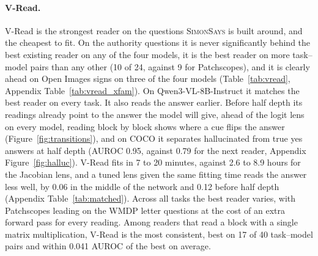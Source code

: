 \paragraph{V-Read.} V-Read is the strongest reader on the questions \textsc{SimonSays} is built around, and the cheapest to fit. On the authority questions it is never significantly behind the best existing reader on any of the four models, it is the best reader on more task--model pairs than any other (10 of 24, against 9 for Patchscopes), and it is clearly ahead on Open Images signs on three of the four models (Table~\ref{tab:vread}, Appendix Table~\ref{tab:vread_xfam}). On Qwen3-VL-8B-Instruct it matches the best reader on every task. It also reads the answer earlier. Before half depth its readings already point to the answer the model will give, ahead of the logit lens on every model, reading block by block shows where a cue flips the answer (Figure~\ref{fig:transitions}), and on COCO it separates hallucinated from true yes answers at half depth (AUROC 0.95, against 0.79 for the next reader, Appendix Figure~\ref{fig:halluc}). V-Read fits in 7 to 20 minutes, against 2.6 to 8.9 hours for the Jacobian lens, and a tuned lens given the same fitting time reads the answer less well, by 0.06 in the middle of the network and 0.12 before half depth (Appendix Table~\ref{tab:matched}). Across all tasks the best reader varies, with Patchscopes leading on the WMDP letter questions at the cost of an extra forward pass for every reading. Among readers that read a block with a single matrix multiplication, V-Read is the most consistent, best on 17 of 40 task--model pairs and within 0.041 AUROC of the best on average.

